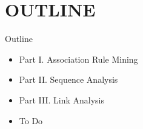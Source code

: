 \documentclass[handout]{beamer}
\begin{document}
\section*{OUTLINE}
\begin{frame}{Outline}
\begin{itemize}
\item Part I. Association Rule Mining
\item Part II. Sequence Analysis
\item Part III. Link Analysis
\vspace*{0.3cm}
\item To Do
\end{itemize}
\end{frame}


\end{document}
